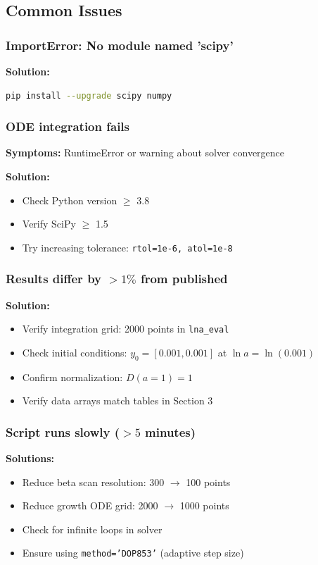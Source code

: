 \documentclass[11pt]{article}
\begin{document}
\subsection{Common Issues}

\subsubsection{ImportError: No module named 'scipy'}

\textbf{Solution:}
\begin{lstlisting}[language=bash]
pip install --upgrade scipy numpy
\end{lstlisting}

\subsubsection{ODE integration fails}

\textbf{Symptoms:} RuntimeError or warning about solver convergence

\textbf{Solution:}
\begin{itemize}
    \item Check Python version $\geq$ 3.8
    \item Verify SciPy $\geq$ 1.5
    \item Try increasing tolerance: \texttt{rtol=1e-6, atol=1e-8}
\end{itemize}

\subsubsection{Results differ by $>1\%$ from published}

\textbf{Solution:}
\begin{itemize}
    \item Verify integration grid: 2000 points in \texttt{lna\_eval}
    \item Check initial conditions: $y_0 = [0.001, 0.001]$ at $\ln a = \ln(0.001)$
    \item Confirm normalization: $D(a=1) = 1$
    \item Verify data arrays match tables in Section 3
\end{itemize}

\subsubsection{Script runs slowly ($>5$ minutes)}

\textbf{Solutions:}
\begin{itemize}
    \item Reduce beta scan resolution: 300 $\to$ 100 points
    \item Reduce growth ODE grid: 2000 $\to$ 1000 points
    \item Check for infinite loops in solver
    \item Ensure using \texttt{method='DOP853'} (adaptive step size)
\end{itemize}
\end{document}
